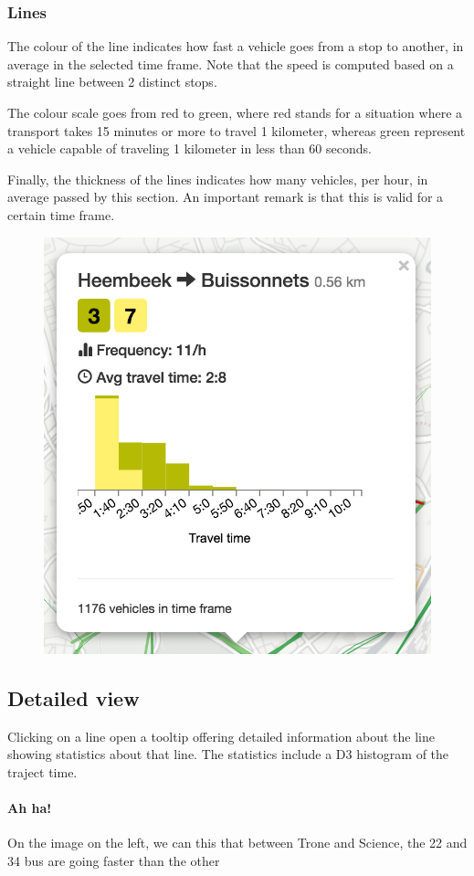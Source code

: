 \documentclass[11pt]{article}%
\begin{document}
\subsubsection{Lines}
The colour of the line indicates how fast a vehicle goes from a stop to another, in average in the selected time frame. Note that the speed is computed based on a straight line between 2 distinct stops.

The colour scale goes from red to green, where red stands for a situation where a transport takes 15 minutes or more to travel 1 kilometer, whereas green represent a vehicle capable of traveling 1 kilometer in less than 60 seconds.

Finally, the thickness of the lines indicates how many vehicles, per hour, in average passed by this section. An important remark is that this is valid for a certain time frame.


\begin{minipage}{0.3\textwidth}
  \begin{figure}[H]
    \includegraphics[width=\textwidth]{images/popup1.png}
  \end{figure}
\end{minipage}\hfill
\begin{minipage}{0.6\textwidth}
    \subsection{Detailed view}
    Clicking on a line open a tooltip offering detailed information about the line showing statistics about that line. The statistics include a D3 histogram of the traject time.
    \paragraph{Ah ha!} On the image on the left, we can this that between Trone and Science, the 22 and 34 bus are going faster than the other
\end{minipage}
\end{document}
